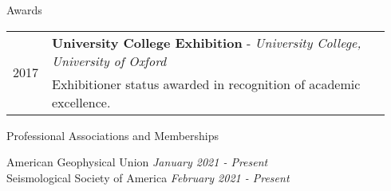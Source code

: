\documentclass{resume}
\begin{document}
\begin{rSection}{Awards}
\begin{tabular}{p{0.07\linewidth} | p{0.87\linewidth}}
\\
\multirow{2}{*}{2017} & \textbf{University College Exhibition} - \textit{University College, University of Oxford} \\ & \hspace{0.7cm} Exhibitioner status awarded in recognition of academic excellence. \\ 


\end{tabular}
\end{rSection}

\vspace{0.2cm}
\begin{rSection}{Professional Associations and Memberships}

{American Geophysical Union} \hfill {\em January 2021 - Present} \\
{Seismological Society of America} \hfill {\em February 2021 - Present} 
\end{rSection}
\end{document}
